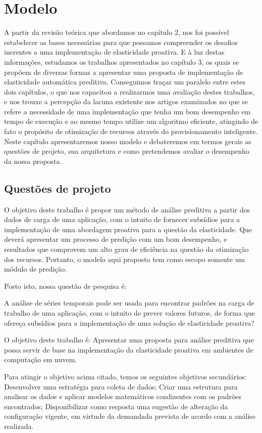 \documentclass[twoside,english,brazilian]{UNISINOSmonografia}
\begin{document}
\chapter{Modelo}
A partir da revisão teórica que abordamos no capítulo 2, nos foi possível estabelecer as bases necessárias para que possamos compreender os desafios inerentes a uma implementação de elasticidade proativa. E à luz destas informações, estudamos os trabalhos apresentados no capítulo 3, os quais se propõem de diversas formas a apresentar uma proposta de implementação de elasticidade automática preditiva. Conseguimos traçar um paralelo entre estes dois capítulos, o que nos capacitou a realizarmos uma avaliação destes trabalhos, e nos trouxe a percepção da lacuna existente nos artigos examinados no que se refere a necessidade de uma implementação que tenha um bom desempenho em tempo de execução e ao mesmo tempo utilize um algoritmo eficiente, atingindo de fato o propósito de otimização de recursos através do provisionamento inteligente. Neste capítulo apresentaremos nosso modelo e debateremos em termos gerais as questões de projeto, sua arquitetura e como pretendemos avaliar o desempenho da nossa proposta.

\section{Questões de projeto}
O objetivo deste trabalho é propor um método de análise preditiva a partir dos dados de carga de uma aplicação, com o intuito de fornecer subsídios para a implementação de uma abordagem proativa para a questão da elasticidade. Que deverá apresentar um processo de predição com um bom desempenho, e resultados que comprovem um alto grau de eficiência na questão da otimização dos recursos. Portanto, o modelo aqui proposto tem como escopo somente um módulo de predição.

Posto isto, nossa questão de pesquisa é:

A análise de séries temporais pode ser usada para encontrar padrões na carga de trabalho de uma aplicação, com o intuito de prever valores futuros, de forma que ofereça subsídios para a implementação de uma solução de elasticidade proativa?

O objetivo deste trabalho é:
Apresentar uma proposta para análise preditiva que possa servir de base na implementação da elasticidade proativa em ambientes de computação em nuvem.

Para atingir o objetivo acima citado, temos os seguintes objetivos secundários:
Desenvolver uma estratégia para coleta de dados;
Criar uma estrutura para analisar os dados e aplicar modelos matemáticos condizentes com os padrões encontrados;
Disponibilizar como resposta uma sugestão de alteração da configuração vigente, em virtude da demandada prevista de acordo com a análise realizada. 
\end{document}
